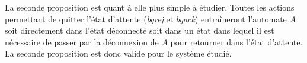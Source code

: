 La seconde proposition est quant à elle plus simple à étudier. Toutes les actions permettant de quitter l'état d'attente (\emph{bgrej} et \emph{bgack}) entraîneront l'automate $A$ soit directement dans l'état déconnecté soit dans un état dans lequel il est nécessaire de passer par la déconnexion de $A$ pour retourner dans l'état d'attente.  La seconde proposition est donc valide pour le système étudié.





